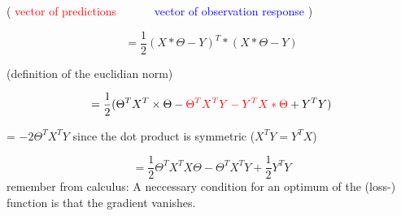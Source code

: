 	\begin{center}
	( \textcolor{red}{vector of predictions}$\quad\quad\quad$ \textcolor{blue}{vector of observation response} )
	\end{center}
	\[ = \frac{1}{2} (X * \Theta -Y)^T * (X * \Theta - Y)\]
	\begin{center}
	(definition of the euclidian norm)
	\end{center}
	\[ = \frac{1}{2} (\Theta^T X^T \times \Theta - \textcolor{red}{\Theta^T X^T Y - Y^T X*\Theta} + Y^T Y)\]
	\begin{center}
	= $-2 \Theta^T X^T Y$ since the dot product is symmetric ($X^T Y = Y^T X$)
	\end{center}
	\[= \frac{1}{2} \Theta^T X^T X \Theta - \Theta^T X^T Y + \frac{1}{2} Y^T Y\]
	remember from calculus: A neccessary condition for an optimum of the (loss-) function is that the gradient vanishes.\\
	
